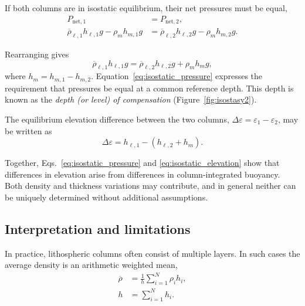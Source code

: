 If both columns are in isostatic equilibrium, their net pressures must be equal,
\begin{align*}
    P_{\mathrm{net},1} &= P_{\mathrm{net},2} , \\
    \overline{\rho}_{\ell,1} h_{\ell,1} g - \rho_m h_{m,1} g 
    &= \overline{\rho}_{\ell,2} h_{\ell,2} g - \rho_m h_{m,2} g .
\end{align*}

Rearranging gives
\begin{equation}
    \overline{\rho}_{\ell,1} h_{\ell,1} g
    =
    \overline{\rho}_{\ell,2} h_{\ell,2} g + \rho_m h_m g ,
    \label{eq:isostatic_pressure}
\end{equation}
where $h_m = h_{m,1} - h_{m,2}$.
Equation~\ref{eq:isostatic_pressure} expresses the requirement that pressures be equal at a common reference depth.
This depth is known as the \emph{depth (or level) of compensation} (Figure~\ref{fig:isostasy2}).

The equilibrium elevation difference between the two columns,
$\Delta \varepsilon = \varepsilon_1 - \varepsilon_2$,
may be written as
\begin{equation}
    \Delta \varepsilon = h_{\ell,1} - (h_{\ell,2} + h_m) .
    \label{eq:isostatic_elevation}
\end{equation}

Together, Eqs.~\ref{eq:isostatic_pressure} and \ref{eq:isostatic_elevation} show that differences in elevation arise from differences in column-integrated buoyancy.
Both density and thickness variations may contribute, and in general neither can be uniquely determined without additional assumptions.



\subsection{Interpretation and limitations}

In practice, lithospheric columns often consist of multiple layers.
In such cases the average density is an arithmetic weighted mean,
\begin{align*}
    \overline{\rho} &= \frac{1}{h} \sum_{i=1}^{N} \rho_i h_i , \\
    h &= \sum_{i=1}^{N} h_i .
\end{align*}

